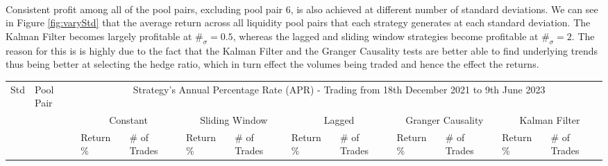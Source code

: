 \\[5mm]
Consistent profit among all of the pool pairs, excluding pool pair 6, is also achieved at different number of standard deviations. We can see in Figure \ref{fig:varyStd} that the average return across all liquidity pool pairs that each strategy generates at each standard deviation. The Kalman Filter becomes largely profitable at $\#_{\sigma} = 0.5$, whereas the lagged and sliding window strategies become profitable at $\#_{\sigma} = 2$. The reason for this is is highly due to the fact that the Kalman Filter and the Granger Causality tests are better able to find underlying trends thus being better at selecting the hedge ratio, which in turn effect the volumes being traded and hence the effect the returns.

\begin{table}[!htb]
    \centering
    \begin{adjustwidth}{-0.8in}{-0.9in}
        \begin{tabular}{|p{4em}|p{2em}|p{3em}|p{3em}|p{3em}|p{3em}|p{3em}|p{3em}|p{3em}|p{3em}|p{3em}|p{3em}|}\hline
            Std & Pool Pair & \multicolumn{10}{|c|}{Strategy's Annual Percentage Rate (APR) - Trading from 18th December 2021 to 9th June 2023} \\\cline{3-12}
            &   & \multicolumn{2}{|c|}{Constant} & \multicolumn{2}{|c|}{Sliding Window} & \multicolumn{2}{|c|}{Lagged} & \multicolumn{2}{|c|}{Granger Causality} & \multicolumn{2}{|c|}{Kalman Filter}\\\cline{3-12}
            & & Return \% & \# of Trades & Return \% & \# of Trades & Return \% & \# of Trades & Return \% & \# of Trades & Return \% & \# of Trades\\\hline


\end{tabular}
\end{adjustwidth}
\end{table}
